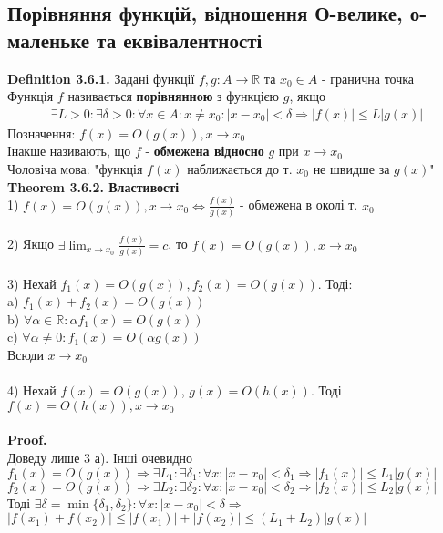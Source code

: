 \documentclass[a4paper, 14pt]{extarticle}
\def\huge{\displaystyle}
\def\bigline{\vspace{5mm}\\}
\def\defin#1{\textbf{Definition {#1}}}
\def\th#1{\textbf{Theorem {#1}}}
\def\proof{\textbf{Proof.}\\}
\def\bigline{\vspace{5mm}\\}
\begin{document}
\subsection{Порівняння функцій, відношення О-велике, о-маленьке та еквівалентності}
\defin{3.6.1.} Задані функції $f,g: A \to \mathbb{R}$ та $x_0 \in A$ - гранична точка\\
Функція $f$ називається \textbf{порівнянною} з функцією $g$, якщо
\begin{align*}
\exists L>0: \exists \delta > 0: \forall x \in A: x \neq x_0: |x-x_0| < \delta \Rightarrow |f(x)| \leq L |g(x)|
\end{align*}
Позначення: $f(x) = O(g(x)), x \to x_0$\\
Інакше називають, що $f$ - \textbf{обмежена відносно} $g$ при $x \to x_0$\\
Чоловіча мова: "функція $f(x)$ наближається до т. $x_0$ не швидше за $g(x)$"
\bigline
\th{3.6.2. Властивості}\\
1) $f(x) = O(g(x)), x \to x_0 \iff \huge \frac{f(x)}{g(x)}$ - обмежена в околі т. $x_0$\\
\\
2) Якщо $\exists \huge \lim_{x \to x_0} \frac{f(x)}{g(x)} = c$, то $f(x) = O(g(x)), x \to x_0$\\
\\
3) Нехай $f_1(x) = O(g(x)), f_2(x) = O(g(x))$. Тоді:\\
a) $f_1(x) + f_2(x) = O(g(x))$\\
b) $\forall \alpha \in \mathbb{R}: \alpha f_1(x) = O(g(x))$\\
c) $\forall \alpha \neq 0: f_1(x) = O(\alpha g(x))$\\
Всюди $x \to x_0$\\
\\
4) Нехай $f(x) = O(g(x))$, $g(x) = O(h(x))$. Тоді $f(x) = O(h(x)), x \to x_0$\\
\\
\proof
Доведу лише 3 а). Інші очевидно\\
$f_1(x) = O(g(x)) \Rightarrow \exists L_1: \exists \delta_1: \forall x : |x-x_0| < \delta_1 \Rightarrow |f_1(x)| \leq L_1 |g(x)|$
$f_2(x) = O(g(x)) \Rightarrow \exists L_2: \exists \delta_2: \forall x : |x-x_0| < \delta_2 \Rightarrow |f_2(x)| \leq L_2 |g(x)|$\\
Тоді $\exists \delta = \min\{\delta_1, \delta_2 \}: \forall x: |x-x_0|<\delta \Rightarrow$\\
$|f(x_1)+f(x_2)| \leq |f(x_1)|+|f(x_2)| \leq (L_1+L_2)|g(x)|$\\
\end{document}
